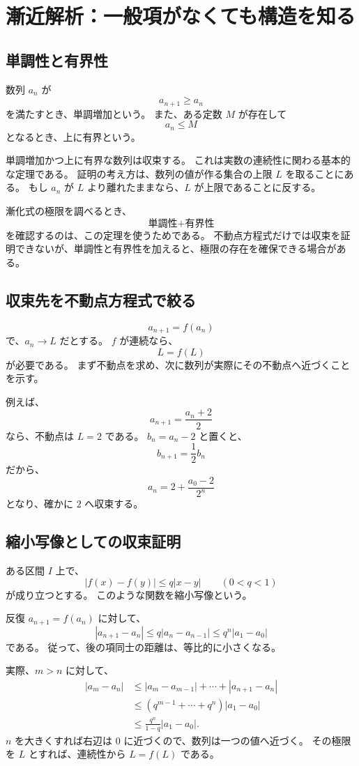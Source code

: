 
\section{漸近解析：一般項がなくても構造を知る}

\subsection{単調性と有界性}

数列 $a_n$ が
\[
  a_{n+1}\geq a_n
\]
を満たすとき、単調増加という。
また、ある定数 $M$ が存在して
\[
  a_n\leq M
\]
となるとき、上に有界という。

単調増加かつ上に有界な数列は収束する。
これは実数の連続性に関わる基本的な定理である。
証明の考え方は、数列の値が作る集合の上限 $L$ を取ることにある。
もし $a_n$ が $L$ より離れたままなら、$L$ が上限であることに反する。

漸化式の極限を調べるとき、
\[
  \text{単調性}+\text{有界性}
\]
を確認するのは、この定理を使うためである。
不動点方程式だけでは収束を証明できないが、単調性と有界性を加えると、極限の存在を確保できる場合がある。

\subsection{収束先を不動点方程式で絞る}

\[
  a_{n+1}=f(a_n)
\]
で、$a_n\to L$ だとする。
$f$ が連続なら、
\[
  L=f(L)
\]
が必要である。
まず不動点を求め、次に数列が実際にその不動点へ近づくことを示す。

例えば、
\[
  a_{n+1}=\frac{a_n+2}{2}
\]
なら、不動点は $L=2$ である。
$b_n=a_n-2$ と置くと、
\[
  b_{n+1}=\frac12b_n
\]
だから、
\[
  a_n=2+\frac{a_0-2}{2^n}
\]
となり、確かに $2$ へ収束する。

\subsection{縮小写像としての収束証明}

ある区間 $I$ 上で、
\[
  |f(x)-f(y)|\leq q|x-y|
  \qquad(0<q<1)
\]
が成り立つとする。
このような関数を縮小写像という。

反復 $a_{n+1}=f(a_n)$ に対して、
\[
  |a_{n+1}-a_n|
  \leq q|a_n-a_{n-1}|
  \leq q^n|a_1-a_0|
\]
である。
従って、後の項同士の距離は、等比的に小さくなる。

実際、$m>n$ に対して、
\[
  \begin{aligned}
    |a_m-a_n|
     & \leq
    |a_m-a_{m-1}|+\cdots+|a_{n+1}-a_n| \\
     & \leq
    (q^{m-1}+\cdots+q^n)|a_1-a_0|      \\
     & \leq
    \frac{q^n}{1-q}|a_1-a_0|.
  \end{aligned}
\]
$n$ を大きくすれば右辺は $0$ に近づくので、数列は一つの値へ近づく。
その極限を $L$ とすれば、連続性から $L=f(L)$ である。

